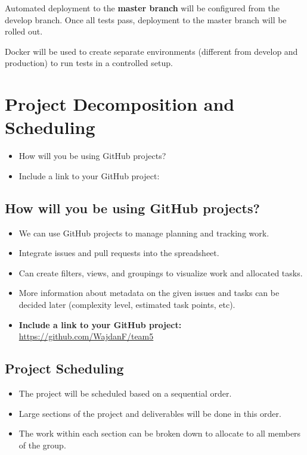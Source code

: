 \documentclass{article}
\begin{document}
Automated deployment to the \textbf{master branch} will be configured from the develop branch. Once all tests pass, deployment to the master branch will be rolled out.

Docker will be used to create separate environments (different from develop and production) to run tests in a controlled setup.


\section{Project Decomposition and Scheduling}

\begin{itemize}
  \item How will you be using GitHub projects?
  \item Include a link to your GitHub project: 
\end{itemize}



\subsection*{How will you be using GitHub projects?}
\begin{itemize}
    \item We can use GitHub projects to manage planning and tracking work.
    \item Integrate issues and pull requests into the spreadsheet.
    \item Can create filters, views, and groupings to visualize work and allocated tasks.
    \item More information about metadata on the given issues and tasks can be decided later (complexity level, estimated task points, etc).
    \item \textbf{Include a link to your GitHub project:} \href{https://github.com/WajdanF/team5}{https://github.com/WajdanF/team5}

\end{itemize}

\subsection*{Project Scheduling}
\begin{itemize}
    \item The project will be scheduled based on a sequential order.
    \item Large sections of the project and deliverables will be done in this order.
    \item The work within each section can be broken down to allocate to all members of the group.
\end{itemize}
\end{document}
